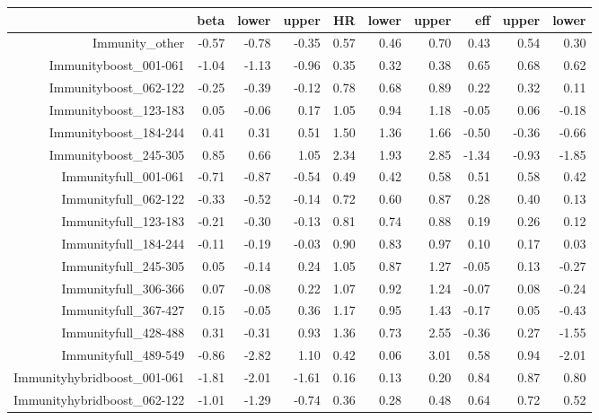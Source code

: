 \begin{table}[ht]
\centering
\begin{tabular}{rrrrrrrrrr}
  \hline
 & beta & lower & upper & HR & lower & upper & eff & upper & lower \\ 
  \hline
Immunity\_other & -0.57 & -0.78 & -0.35 & 0.57 & 0.46 & 0.70 & 0.43 & 0.54 & 0.30 \\ 
  Immunityboost\_001-061 & -1.04 & -1.13 & -0.96 & 0.35 & 0.32 & 0.38 & 0.65 & 0.68 & 0.62 \\ 
  Immunityboost\_062-122 & -0.25 & -0.39 & -0.12 & 0.78 & 0.68 & 0.89 & 0.22 & 0.32 & 0.11 \\ 
  Immunityboost\_123-183 & 0.05 & -0.06 & 0.17 & 1.05 & 0.94 & 1.18 & -0.05 & 0.06 & -0.18 \\ 
  Immunityboost\_184-244 & 0.41 & 0.31 & 0.51 & 1.50 & 1.36 & 1.66 & -0.50 & -0.36 & -0.66 \\ 
  Immunityboost\_245-305 & 0.85 & 0.66 & 1.05 & 2.34 & 1.93 & 2.85 & -1.34 & -0.93 & -1.85 \\ 
  Immunityfull\_001-061 & -0.71 & -0.87 & -0.54 & 0.49 & 0.42 & 0.58 & 0.51 & 0.58 & 0.42 \\ 
  Immunityfull\_062-122 & -0.33 & -0.52 & -0.14 & 0.72 & 0.60 & 0.87 & 0.28 & 0.40 & 0.13 \\ 
  Immunityfull\_123-183 & -0.21 & -0.30 & -0.13 & 0.81 & 0.74 & 0.88 & 0.19 & 0.26 & 0.12 \\ 
  Immunityfull\_184-244 & -0.11 & -0.19 & -0.03 & 0.90 & 0.83 & 0.97 & 0.10 & 0.17 & 0.03 \\ 
  Immunityfull\_245-305 & 0.05 & -0.14 & 0.24 & 1.05 & 0.87 & 1.27 & -0.05 & 0.13 & -0.27 \\ 
  Immunityfull\_306-366 & 0.07 & -0.08 & 0.22 & 1.07 & 0.92 & 1.24 & -0.07 & 0.08 & -0.24 \\ 
  Immunityfull\_367-427 & 0.15 & -0.05 & 0.36 & 1.17 & 0.95 & 1.43 & -0.17 & 0.05 & -0.43 \\ 
  Immunityfull\_428-488 & 0.31 & -0.31 & 0.93 & 1.36 & 0.73 & 2.55 & -0.36 & 0.27 & -1.55 \\ 
  Immunityfull\_489-549 & -0.86 & -2.82 & 1.10 & 0.42 & 0.06 & 3.01 & 0.58 & 0.94 & -2.01 \\ 
  Immunityhybridboost\_001-061 & -1.81 & -2.01 & -1.61 & 0.16 & 0.13 & 0.20 & 0.84 & 0.87 & 0.80 \\ 
  Immunityhybridboost\_062-122 & -1.01 & -1.29 & -0.74 & 0.36 & 0.28 & 0.48 & 0.64 & 0.72 & 0.52 \\ 

\end{tabular}
\end{table}
